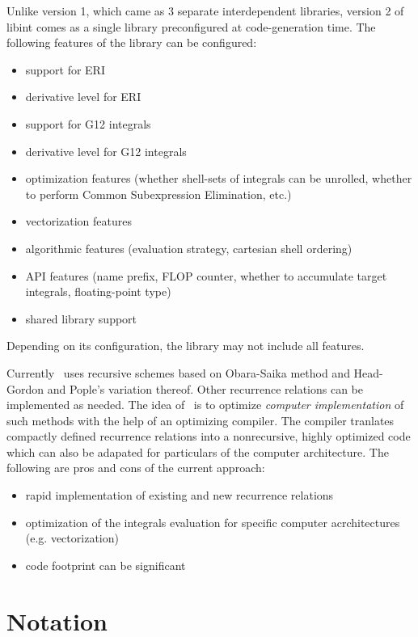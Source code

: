 \documentclass[12pt]{article}
\begin{document}
Unlike version 1, which came as 3 separate interdependent libraries, version 2 of libint
comes as a single library preconfigured at code-generation time.
The following features of the library can be configured:
\begin{itemize}
\item support for ERI
\item derivative level for ERI
\item support for G12 integrals
\item derivative level for G12 integrals
\item optimization features (whether shell-sets of integrals can be unrolled,
whether to perform Common Subexpression Elimination, etc.)
\item vectorization features
\item algorithmic features (evaluation strategy, cartesian shell ordering)
\item API features (name prefix, FLOP counter, whether to accumulate target integrals, floating-point type)
\item shared library support
\end{itemize}
Depending on its configuration, the library may not include all features.

Currently \LIBINT\ uses recursive schemes based on Obara-Saika method\cite{Obara86} and Head-Gordon and Pople's
variation thereof.\cite{Head-Gordon88} Other recurrence relations can be implemented as needed.
The idea of \LIBINT\ is to optimize {\em computer implementation} of such methods with
the help of an optimizing compiler. The compiler tranlates compactly defined recurrence relations
into a nonrecursive, highly optimized code which can also be adapated for particulars of the
computer architecture.
The following are pros and cons of the current approach:
\begin{itemize}
\item rapid implementation of existing and new recurrence relations
\item optimization of the integrals evaluation for specific computer acrchitectures (e.g. vectorization)
\item code footprint can be significant
\end{itemize}

\section{Notation}
\end{document}
